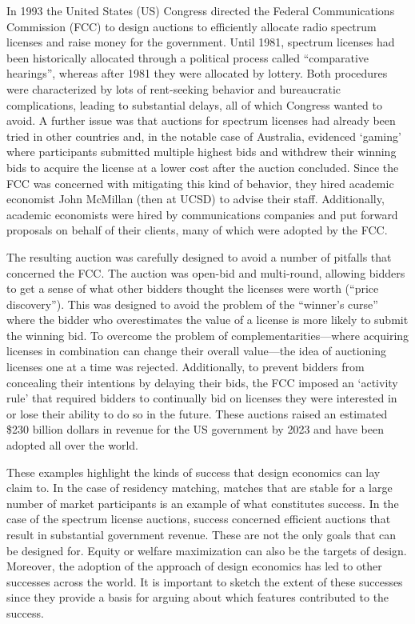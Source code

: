 \begin{example}
    In 1993 the United States (US) Congress directed the Federal Communications Commission (FCC) to design auctions to efficiently allocate radio spectrum licenses and raise money for the government. Until 1981, spectrum licenses had been historically allocated through a political process called ``comparative hearings'', whereas after 1981 they were allocated by lottery. Both procedures were characterized by lots of rent-seeking behavior and bureaucratic complications, leading to substantial delays, all of which Congress wanted to avoid. A further issue was that auctions for spectrum licenses had already been tried in other countries and, in the notable case of Australia, evidenced `gaming' where participants submitted multiple highest bids and withdrew their winning bids to acquire the license at a lower cost after the auction concluded. Since the FCC was concerned with mitigating this kind of behavior, they hired academic economist John McMillan (then at UCSD) to advise their staff. Additionally, academic economists were hired by communications companies and put forward proposals on behalf of their clients, many of which were adopted by the FCC.

    The resulting auction was carefully designed to avoid a number of pitfalls that concerned the FCC. The auction was open-bid and multi-round, allowing bidders to get a sense of what other bidders thought the licenses were worth (``price discovery''). This was designed to avoid the problem of the ``winner's curse'' where the bidder who overestimates the value of a license is more likely to submit the winning bid. To overcome the problem of complementarities---where acquiring licenses in combination can change their overall value---the idea of auctioning licenses one at a time was rejected. Additionally, to prevent bidders from concealing their intentions by delaying their bids, the FCC imposed an `activity rule' that required bidders to continually bid on licenses they were interested in or lose their ability to do so in the future. These auctions raised an estimated \$230 billion dollars in revenue for the US government by 2023 \autocite{brookings2023} and have been adopted all over the world.
\end{example}

\noindent These examples highlight the kinds of success that design economics can lay claim to. In the case of residency matching, matches that are stable for a large number of market participants is an example of what constitutes success. In the case of the spectrum license auctions, success concerned efficient auctions that result in substantial government revenue. These are not the only goals that can be designed for. Equity or welfare maximization can also be the targets of design. Moreover, the adoption of the approach of design economics has led to other successes across the world. It is important to sketch the extent of these successes since they provide a basis for arguing about which features contributed to the success.

